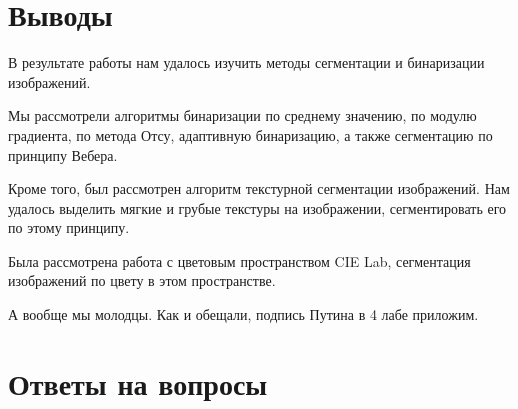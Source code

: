 
\FloatBarrier


\FloatBarrier





\section{Выводы}

В результате работы нам удалось изучить методы сегментации и бинаризации изображений. 

Мы рассмотрели алгоритмы бинаризации по среднему значению, по модулю градиента, 
по метода Отсу, адаптивную бинаризацию, а также сегментацию по принципу Вебера.

Кроме того, был рассмотрен алгоритм текстурной сегментации изображений. 
Нам удалось выделить мягкие и грубые текстуры на изображении, сегментировать его по этому принципу. 

Была рассмотрена работа с цветовым пространством CIE Lab, сегментация изображений по цвету в этом пространстве.

А вообще мы молодцы. Как и обещали, подпись Путина в 4 лабе приложим.


\section{Ответы на вопросы}

\setcounter{question}{0}

\newcommand{\question}[1]{\item[Q\refstepcounter{question}\thequestion.] #1}
\newcommand{\answer}[1]{\item[A\thequestion.] #1}


